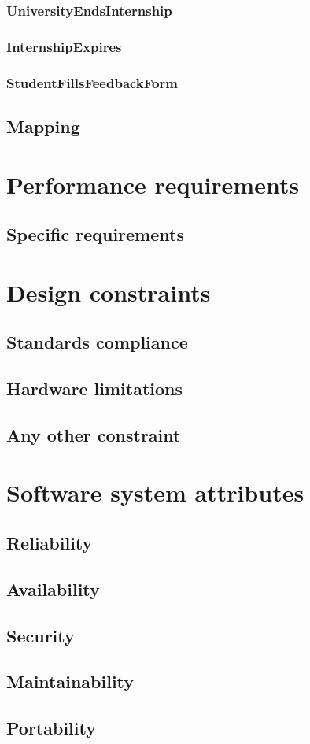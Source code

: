\subsubsection{UniversityEndsInternship}

\subsubsection{InternshipExpires}

\subsubsection{StudentFillsFeedbackForm}

\subsection{Mapping}

\section{Performance requirements}

\subsection{Specific requirements}

\section{Design constraints}
\subsection{Standards compliance}
\subsection{Hardware limitations}
\subsection{Any other constraint}

\section{Software system attributes}
\subsection{Reliability}
\subsection{Availability}
\subsection{Security}
\subsection{Maintainability}
\subsection{Portability}